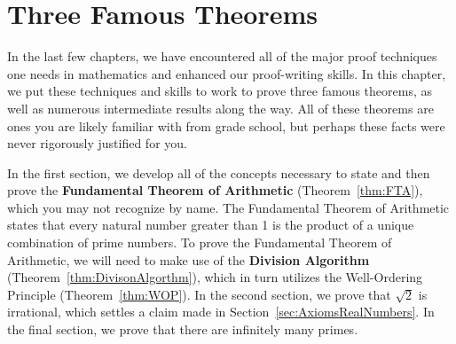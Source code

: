 \chapter{Three Famous Theorems}\label{chap:ThreeFamousTheorems}


In the last few chapters, we have encountered all of the major proof techniques one needs in mathematics and enhanced our proof-writing skills.  In this chapter, we put these techniques and skills to work to prove three famous theorems, as well as numerous intermediate results along the way.  All of these theorems are ones you are likely familiar with from grade school, but perhaps these facts were never rigorously justified for you. 

In the first section, we develop all of the concepts necessary to state and then prove the \textbf{Fundamental Theorem of Arithmetic} (Theorem~\ref{thm:FTA}), which you may not recognize by name. The Fundamental Theorem of Arithmetic states that every natural number greater than 1 is the product of a unique combination of prime numbers. To prove the Fundamental Theorem of Arithmetic, we will need to make use of the \textbf{Division Algorithm} (Theorem~\ref{thm:DivisonAlgorthm}), which in turn utilizes the Well-Ordering Principle (Theorem~\ref{thm:WOP}). In the second section, we prove that $\sqrt{2}$ is irrational, which settles a claim made in Section~\ref{sec:AxiomsRealNumbers}. In the final section, we prove that there are infinitely many primes.